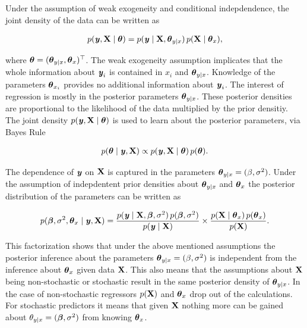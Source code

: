 \documentclass[11pt,a4paper,twoside]{book}\usepackage[]{graphicx}\usepackage[]{color}
\begin{document}
Under the assumption of weak exogeneity and conditional indepdendence, the joint density of the data can be written as

       \begin{align*} 
p({\textbf{\textit{y}}}, {\mathbf{X}} \mid {\boldsymbol{\theta}}{}) = p({\textbf{\textit{y}}} \mid {\mathbf{X}}, {\boldsymbol{\theta}}{}_{y \mid x}) \, p({\mathbf{X}} \mid {\boldsymbol{\theta}}{}_{x}),
   \end{align*}

where ${\boldsymbol{\theta}}{} = ({\boldsymbol{\theta}}{}_{y \mid x}, {\boldsymbol{\theta}}{}_{x})^\top$. The weak exogeneity assumption implicates that the whole information about ${\textbf{\textit{y}}}_{i}$ is contained in $x_{i}$ and ${\boldsymbol{\theta}}{}_{y \mid x}$. Knowledge of the parameters ${\boldsymbol{\theta}}{}_{x_{i}}$ provides no additional information about ${\textbf{\textit{y}}}_{i}$.
The interest of regression is mostly in the posterior parameters ${\boldsymbol{\theta}}{}_{y \mid x}$. These posterior densities are proportional to the likelihood of the data  multiplied by the prior densitiy. The joint density $p({\textbf{\textit{y}}}, {\mathbf{X}} \mid  {\boldsymbol{\theta}}{})$ is used to learn about the posterior parameters, via Bayes Rule

       \begin{align*} 
p({\boldsymbol{\theta}}{} \mid {\textbf{\textit{y}}}, {\mathbf{X}}) \propto p({\textbf{\textit{y}}}, {\mathbf{X}} \mid  {\boldsymbol{\theta}}{}) \, p({\boldsymbol{\theta}}{}).
   \end{align*}
   
   The dependence of ${\textbf{\textit{y}}}$ on ${\mathbf{X}}$ is captured in the parameters ${\boldsymbol{\theta}}{}_{y \mid x} = (\beta, \sigma^2)$. Under the assumption of indepdentent prior densities about ${\boldsymbol{\theta}}{}_{y \mid x}$ and ${\boldsymbol{\theta}}{}_{x}$ the posterior distribution of the parameters can be written as
   
          \begin{align} 
p({\boldsymbol{\beta}}, \sigma^2, {\boldsymbol{\theta}}{}_{x} \mid {\textbf{\textit{y}}}, {\mathbf{X}}) = \frac{p({\textbf{\textit{y}}} \mid {\mathbf{X}}, {\boldsymbol{\beta}}, \sigma^2) \, p({\boldsymbol{\beta}}, \sigma^2)}{p({\textbf{\textit{y}}} \mid {\mathbf{X}})} \times \frac{p({\mathbf{X}} \mid {\boldsymbol{\theta}}{}_{x}) \, p({\boldsymbol{\theta}}{}_{x})}{p({\mathbf{X}})}.  \label{eq:bayesf} 
   \end{align}
   
  This factorization shows that under the above mentioned assumptions the posterior inference about the parameters ${\boldsymbol{\theta}}{}_{y \mid x} = (\beta, \sigma^2)$ is independent from the inference about ${\boldsymbol{\theta}}{}_{x}$ given data ${\mathbf{X}}$. This also means that the assumptions about ${\mathbf{X}}$ being non-stochastic or stochastic result in the same posterior density of  ${\boldsymbol{\theta}}{}_{y \mid x}$. In the case of non-stochastic regressors $p({\mathbf{X}})$ and ${\boldsymbol{\theta}}{}_{x}$ drop out of the calculations. For stochastic predictors it means that given ${\mathbf{X}}$ nothing more can be gained about $\theta_{y \mid x} = ({\boldsymbol{\beta}}, \sigma^2)$ from knowing ${\boldsymbol{\theta}}{}_{x}$. 
  
\end{document}
